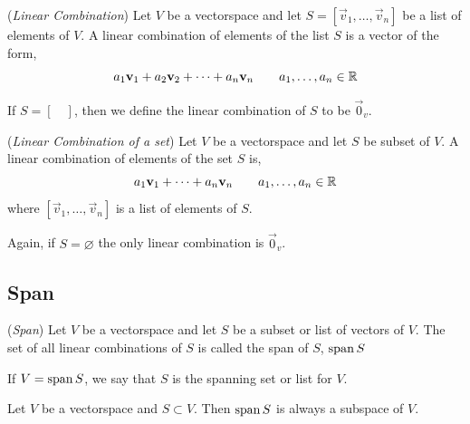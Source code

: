 \documentclass{article}
\begin{document}
\noindent
\begin{ndefi}{(\textit{Linear Combination})}
  Let $V$ be a vectorspace and let $S = [\vec v_1, \dots, \vec v_n]$ be a list of elements of $V$. A linear combination of elements of the list $S$ is a vector of the form,
  $$ a_1\boldsymbol{\mathbf{v}}_1 + a_2\boldsymbol{\mathbf{v}}_2 + \dots + a_n\boldsymbol{\mathbf{v}}_n \qquad a_1,\dots,a_n \in \mathbb{R}$$
\end{ndefi}

If $S = [\quad]$, then we define the linear combination of $S$ to be $\vec 0_v$.

\noindent
\begin{ndefi}{(\textit{Linear Combination of a set})}
  Let $V$ be a vectorspace and let $S$ be subset of $V$. A linear combination of elements of the set $S$ is,
  $$ a_1\boldsymbol{\mathbf{v}}_1 + \dots + a_n\boldsymbol{\mathbf{v}}_n \qquad a_1,\dots,a_n \in \mathbb{R} $$
  where $[\vec v_1, \dots, \vec v_n]$ is a list of elements of $S$.
\end{ndefi}

Again, if $S = \varnothing$ the only linear combination is $\vec 0_v$.

\subsection{Span}
\begin{ndefi}{(\textit{Span})}
  Let $V$ be a vectorspace and let $S$ be a subset or list of vectors of $V$. The set of all linear combinations of $S$ is called the span of $S$, $\operatorname{span} S$
\end{ndefi}

If $V = \operatorname{span} S$, we say that $S$ is the spanning set or list for $V$.

\begin{nlemma}
  Let $V$ be a vectorspace and $S \subset V$. Then $\operatorname{span} S$ is always a subspace of $V$.
\end{nlemma}
\end{document}
